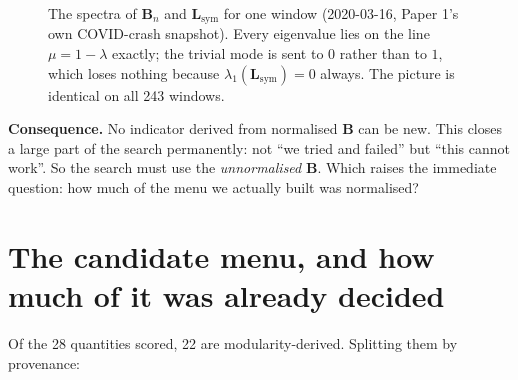 \documentclass[11pt,a4paper]{article}
\newcommand{\Lap}{\mathbf{L}}
\newcommand{\Bmat}{\mathbf{B}}
\newcommand{\Lsym}{\Lap_{\mathrm{sym}}}
\newcommand{\Bn}{\Bmat_{n}}
\begin{document}
\begin{figure}[h]\centering
{}
\caption{The spectra of $\Bn$ and $\Lsym$ for one window (2020-03-16, Paper 1's
own COVID-crash snapshot). Every eigenvalue lies on the line $\mu = 1-\lambda$
exactly; the trivial mode is sent to $0$ rather than to $1$, which loses nothing
because $\lambda_1(\Lsym)=0$ always. The picture is identical on all 243 windows.}
\end{figure}

\textbf{Consequence.} No indicator derived from normalised $\Bmat$ can be new.
This closes a large part of the search permanently: not ``we tried and failed''
but ``this cannot work''. So the search must use the \emph{unnormalised} $\Bmat$.
Which raises the immediate question: how much of the menu we actually built was
normalised?

\section{The candidate menu, and how much of it was already decided}

Of the 28 quantities scored, 22 are modularity-derived. Splitting them by
provenance:
\end{document}
